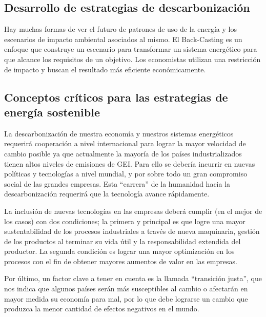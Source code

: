 \documentclass[runningheads]{llncs}
\begin{document}
\subsection*{Desarrollo de estrategias de descarbonización}
Hay muchas formas de ver el futuro de patrones de uso de la energía y los escenarios de impacto ambiental asociados al mismo. El Back-Casting es un enfoque que construye un escenario para transformar un sistema energético para que alcance los requisitos de un objetivo. Los economistas utilizan una restricción de impacto y buscan el resultado más eficiente económicamente.

\subsection*{Conceptos críticos para las estrategias de energía sostenible}
La descarbonización de nuestra economía y nuestros sistemas energéticos requerirá cooperación a nivel internacional para lograr la mayor velocidad de cambio posible ya que actualmente la mayoría de los países industrializados tienen altos niveles de emisiones de GEI. Para ello se debería incurrir en nuevas políticas y tecnologías a nivel mundial, y por sobre todo un gran compromiso social de las grandes empresas. Esta “carrera” de la humanidad hacia la descarbonización requerirá que la tecnología avance rápidamente.\\ \par
La inclusión de nuevas tecnologías en las empresas deberá cumplir (en el mejor de los casos) con dos condiciones; la primera y principal es que logre una mayor sustentabilidad de los procesos industriales a través de nueva maquinaria, gestión de los productos al terminar su vida útil y la responsabilidad extendida del productor. La segunda condición es lograr una mayor optimización en los procesos con el fin de obtener mayores aumentos de valor en las empresas.\\ \par
Por último, un factor clave a tener en cuenta es la llamada “transición justa”, que nos indica que algunos países serán más susceptibles al cambio o afectarán en mayor medida su economía para mal, por lo que debe lograrse un cambio que produzca la menor cantidad de efectos negativos en el mundo.
\end{document}
